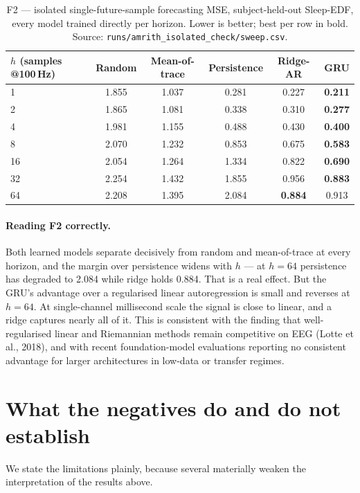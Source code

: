 \documentclass[11pt]{article}
\begin{document}
\begin{table}[h]
\centering
\small
\caption{F2 --- isolated single-future-sample forecasting MSE, subject-held-out
Sleep-EDF, every model trained directly per horizon. Lower is better; best per
row in bold. Source: \texttt{runs/amrith\_isolated\_check/sweep.csv}.}
\label{tab:f2}
\begin{tabular}{@{}lccccc@{}}
\toprule
$h$ (samples @100\,Hz) & Random & Mean-of-trace & Persistence & Ridge-AR & GRU \\
\midrule
1  & 1.855 & 1.037 & 0.281 & 0.227 & \textbf{0.211} \\
2  & 1.865 & 1.081 & 0.338 & 0.310 & \textbf{0.277} \\
4  & 1.981 & 1.155 & 0.488 & 0.430 & \textbf{0.400} \\
8  & 2.070 & 1.232 & 0.853 & 0.675 & \textbf{0.583} \\
16 & 2.054 & 1.264 & 1.334 & 0.822 & \textbf{0.690} \\
32 & 2.254 & 1.432 & 1.855 & 0.956 & \textbf{0.883} \\
64 & 2.208 & 1.395 & 2.084 & \textbf{0.884} & 0.913 \\
\bottomrule
\end{tabular}
\end{table}

\paragraph{Reading F2 correctly.} Both learned models separate decisively from
random and mean-of-trace at every horizon, and the margin over persistence widens
with $h$ --- at $h=64$ persistence has degraded to 2.084 while ridge holds 0.884.
That is a real effect. But the GRU's advantage over a regularised linear
autoregression is small and reverses at $h=64$. At single-channel millisecond
scale the signal is close to linear, and a ridge captures nearly all of it. This
is consistent with the finding that well-regularised linear and Riemannian
methods remain competitive on EEG (Lotte et al., 2018), and with recent
foundation-model evaluations reporting no consistent advantage for larger
architectures in low-data or transfer regimes.

\section{What the negatives do and do not establish}

We state the limitations plainly, because several materially weaken the
interpretation of the results above.
\end{document}
